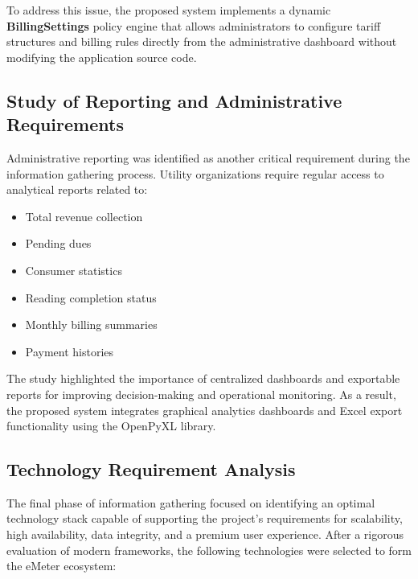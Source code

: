 \documentclass[12pt, a4paper, onecolumn]{report}
\begin{document}
To address this issue, the proposed system implements a dynamic \textbf{BillingSettings} policy engine that allows administrators to configure tariff structures and billing rules directly from the administrative dashboard without modifying the application source code.

\subsection{Study of Reporting and Administrative Requirements}

Administrative reporting was identified as another critical requirement during the information gathering process. Utility organizations require regular access to analytical reports related to:
\begin{itemize}
    \item Total revenue collection
    \item Pending dues
    \item Consumer statistics
    \item Reading completion status
    \item Monthly billing summaries
    \item Payment histories
\end{itemize}

The study highlighted the importance of centralized dashboards and exportable reports for improving decision-making and operational monitoring. As a result, the proposed system integrates graphical analytics dashboards and Excel export functionality using the OpenPyXL library.

\subsection{Technology Requirement Analysis}
The final phase of information gathering focused on identifying an optimal technology stack capable of supporting the project's requirements for scalability, high availability, data integrity, and a premium user experience. After a rigorous evaluation of modern frameworks, the following technologies were selected to form the eMeter ecosystem:
\end{document}

